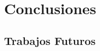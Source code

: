 
\chapter{Conclusiones} \label{cap:conclusiones}

\section{Trabajos Futuros} \label{cap:conclusiones:trabajos_futuros}
